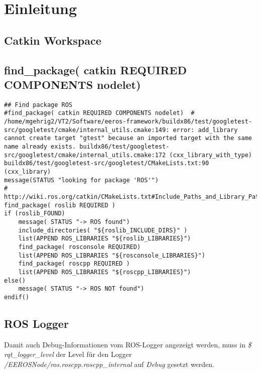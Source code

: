 \chapter{Einleitung}


\section{Catkin Workspace}




\section{find\_package( catkin REQUIRED COMPONENTS nodelet)}
\lstset{language=c}
\begin{lstlisting}
## Find package ROS
#find_package( catkin REQUIRED COMPONENTS nodelet)	# /home/mgehrig2/VT2/Software/eeros-framework/buildx86/test/googletest-src/googletest/cmake/internal_utils.cmake:149: error: add_library cannot create target "gtest" because an imported target with the same name already exists. buildx86/test/googletest-src/googletest/cmake/internal_utils.cmake:172 (cxx_library_with_type) buildx86/test/googletest-src/googletest/CMakeLists.txt:90 (cxx_library)
message(STATUS "looking for package 'ROS'")
# http://wiki.ros.org/catkin/CMakeLists.txt#Include_Paths_and_Library_Paths
find_package( roslib REQUIRED )
if (roslib_FOUND)
	message( STATUS "-> ROS found")
	include_directories( "${roslib_INCLUDE_DIRS}" )
	list(APPEND ROS_LIBRARIES "${roslib_LIBRARIES}")
	find_package( rosconsole REQUIRED)
	list(APPEND ROS_LIBRARIES "${rosconsole_LIBRARIES}")
	find_package( roscpp REQUIRED )
	list(APPEND ROS_LIBRARIES "${roscpp_LIBRARIES}")
else()
	message( STATUS "-> ROS NOT found")
endif()
\end{lstlisting}





\section{ROS Logger}
Damit auch Debug-Informationen vom ROS-Logger angezeigt werden, muss in \textit{\$ rqt\_logger\_level} der Level für den Logger \textit{/EEROSNode/ros.roscpp.roscpp\_internal} auf \textit{Debug} gesetzt werden.